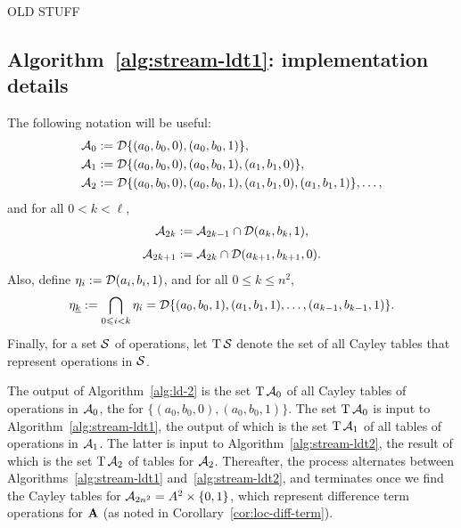   \newpage





  OLD STUFF





  \subsection{Algorithm~\ref{alg:stream-ldt1}: implementation details}
  The following notation will be useful:
  \begin{align*}
    \mathcal{A}_0 &:=\mathcal{D} \{(a_0, b_0, 0), (a_0, b_0, 1)\},\\
  \mathcal{A}_1 &:= \mathcal{D}\{(a_0, b_0, 0), (a_0, b_0, 1), (a_1,b_1,0)\},\\
  \mathcal{A}_2 &:= \mathcal{D}\{(a_0, b_0, 0), (a_0, b_0, 1), (a_1,b_1,0), (a_1,b_1,1)\},\dots,
  \end{align*}
  and for all $0< k < \ell$,
  \begin{align*}
  \mathcal{A}_{2k} &:= \mathcal{A}_{2k-1} \cap \mathcal{D} (a_k,b_k,1),\\[4pt]
  \mathcal{A}_{2k+1} &:= \mathcal{A}_{2k} \cap \mathcal{D} (a_{k+1},b_{k+1},0).
  \end{align*}
  Also, define $\eta_i := \mathcal{D} (a_i, b_i, 1)$, and for all $0\leq k \leq n^2$,
  \[
    \eta_{\underline{k}} := \bigcap_{0\leqslant i < k}\eta_i
      =\mathcal{D} \{(a_0, b_0, 1), (a_1, b_1, 1), \dots, (a_{k-1}, b_{k-1}, 1) \}.
  \]
  Finally, for a set $\mathcal{S}$ of operations, let $\operatorname{T}\mathcal{S}$ denote the set of
  all Cayley tables that represent operations in $\mathcal{S}$.

  The output of Algorithm~\ref{alg:ld-2} is the set $\operatorname{T} \mathcal{A}_0$ of all
  Cayley tables of operations in $\mathcal{A}_0$, the \ldtos for $\{(a_0, b_0, 0), (a_0, b_0, 1)\}$.
  The set $\operatorname{T} \mathcal{A}_0$ is input to Algorithm~\ref{alg:stream-ldt1},
  the output of which is the set $\operatorname{T} \mathcal{A}_1$ of all tables of
  operations in $\mathcal{A}_1$.
  The latter is input to Algorithm~\ref{alg:stream-ldt2}, the result of which is
  the set $\operatorname{T} \mathcal{A}_2$ of tables for $\mathcal{A}_2$.
  Thereafter, the process alternates between
  Algorithms~\ref{alg:stream-ldt1} and~\ref{alg:stream-ldt2}, and
  terminates once we find the Cayley tables for $\mathcal{A}_{2n^2} = A^2 \times \{0,1\}$,
  which represent difference term operations for $\mathbf{A}$ (as noted
  in Corollary~\ref{cor:loc-diff-term}).

